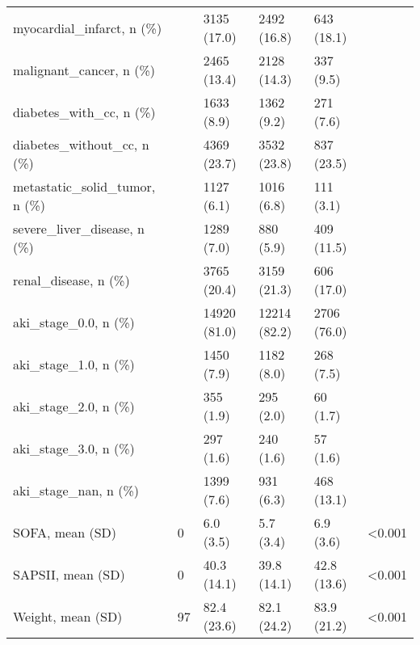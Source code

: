 \begin{tabular}{llllll}
myocardial\_infarct, n (\%)                         &         &    3135 (17.0) &       2492 (16.8) &             643 (18.1) &         \\
malignant\_cancer, n (\%)                           &         &    2465 (13.4) &       2128 (14.3) &              337 (9.5) &         \\
diabetes\_with\_cc, n (\%)                           &         &     1633 (8.9) &        1362 (9.2) &              271 (7.6) &         \\
diabetes\_without\_cc, n (\%)                        &         &    4369 (23.7) &       3532 (23.8) &             837 (23.5) &         \\
metastatic\_solid\_tumor, n (\%)                     &         &     1127 (6.1) &        1016 (6.8) &              111 (3.1) &         \\
severe\_liver\_disease, n (\%)                       &         &     1289 (7.0) &         880 (5.9) &             409 (11.5) &         \\
renal\_disease, n (\%)                              &         &    3765 (20.4) &       3159 (21.3) &             606 (17.0) &         \\
aki\_stage\_0.0, n (\%)                              &         &   14920 (81.0) &      12214 (82.2) &            2706 (76.0) &         \\
aki\_stage\_1.0, n (\%)                              &         &     1450 (7.9) &        1182 (8.0) &              268 (7.5) &         \\
aki\_stage\_2.0, n (\%)                              &         &      355 (1.9) &         295 (2.0) &               60 (1.7) &         \\
aki\_stage\_3.0, n (\%)                              &         &      297 (1.6) &         240 (1.6) &               57 (1.6) &         \\
aki\_stage\_nan, n (\%)                              &         &     1399 (7.6) &         931 (6.3) &             468 (13.1) &         \\
SOFA, mean (SD)                                   &       0 &      6.0 (3.5) &         5.7 (3.4) &              6.9 (3.6) &  <0.001 \\
SAPSII, mean (SD)                                 &       0 &    40.3 (14.1) &       39.8 (14.1) &            42.8 (13.6) &  <0.001 \\
Weight, mean (SD)                                 &      97 &    82.4 (23.6) &       82.1 (24.2) &            83.9 (21.2) &  <0.001 \\

\end{tabular}
